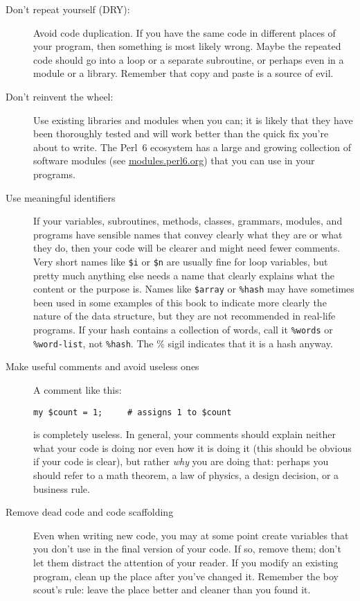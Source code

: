 \begin{description}

\item[Don't repeat yourself (DRY):] Avoid code duplication. 
If you have the same code in different places of your 
program, then something is most likely wrong. Maybe 
the repeated code should go into a loop or a separate 
subroutine, or perhaps even in a module or a library. 
Remember that copy and paste is a source of evil.

\item[Don't reinvent the wheel:] Use existing libraries 
and modules when you can; it is likely that they have 
been thoroughly tested and will work better than the 
quick fix you're about to write. The Perl~6 ecosystem 
has a large and growing collection of software modules 
(see \url{modules.perl6.org}) that you can use in your 
programs.

\item[Use meaningful identifiers] If your variables, 
subroutines, methods, classes, grammars, modules, 
and programs have sensible 
names that convey clearly what they are or what they do, 
then your code will be clearer and might need fewer 
comments. Very short names like \verb'$i' or \verb'$n' are 
usually fine for loop variables, but pretty much anything else needs 
a name that clearly explains what the content or the purpose is. 
Names like \verb'$array' or \verb'%hash' may have sometimes been 
used in some examples of this book to indicate more clearly 
the nature of the data structure, but they are not recommended in 
real-life programs. If your hash contains a collection of 
words, call it \verb'%words' or \verb'%word-list', not 
\verb'%hash'. The \% sigil indicates that it is a hash anyway.

\item[Make useful comments and avoid useless ones] A 
comment like this:
\begin{verbatim}
my $count = 1;     # assigns 1 to $count
\end{verbatim}
is completely useless. In general, your comments should 
explain neither what your code is doing nor even how it is doing 
it (this should be obvious if your code is clear), but 
rather \emph{why} you are doing that: perhaps you should refer 
to a math theorem, a law of physics, a design decision, or 
a business rule.

\item[Remove dead code and code scaffolding] Even when 
writing new code, you may at some point create variables 
that you don't use in the final version of your code. If so, 
remove them; don't let them distract the attention of your 
reader. If you modify an existing program, clean up the place 
after you've changed it. Remember the boy scout's rule: 
leave the place better and cleaner than you found it.


\end{description}
